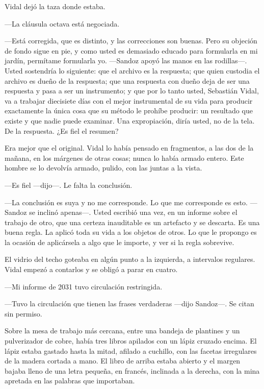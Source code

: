 Vidal dejó la taza donde estaba.

---La cláusula octava está negociada.

---Está corregida, que es distinto, y las correcciones son buenas. Pero su objeción de fondo sigue en pie, y como usted es demasiado educado para formularla en mi jardín, permítame formularla yo. ---Sandoz apoyó las manos en las rodillas---. Usted sostendría lo siguiente: que el archivo es la respuesta; que quien custodia el archivo es dueño de la respuesta; que una respuesta con dueño deja de ser una respuesta y pasa a ser un instrumento; y que por lo tanto usted, Sebastián Vidal, va a trabajar diecisiete días con el mejor instrumental de su vida para producir exactamente la única cosa que su método le prohíbe producir: un resultado que existe y que nadie puede examinar. Una expropiación, diría usted, no de la tela. De la respuesta. ¿Es fiel el resumen?

Era mejor que el original. Vidal lo había pensado en fragmentos, a las dos de la mañana, en los márgenes de otras cosas; nunca lo había armado entero. Este hombre se lo devolvía armado, pulido, con las juntas a la vista.

---Es fiel ---dijo---. Le falta la conclusión.

---La conclusión es suya y no me corresponde. Lo que me corresponde es esto. ---Sandoz se inclinó apenas---. Usted escribió una vez, en un informe sobre el trabajo de otro, que una certeza inauditable es un artefacto y se descarta. Es una buena regla. La aplicó toda su vida a los objetos de otros. Lo que le propongo es la ocasión de aplicársela a algo que le importe, y ver si la regla sobrevive.

El vidrio del techo goteaba en algún punto a la izquierda, a intervalos regulares. Vidal empezó a contarlos y se obligó a parar en cuatro.

---Mi informe de 2031 tuvo circulación restringida.

---Tuvo la circulación que tienen las frases verdaderas ---dijo Sandoz---. Se citan sin permiso.

Sobre la mesa de trabajo más cercana, entre una bandeja de plantines y un pulverizador de cobre, había tres libros apilados con un lápiz cruzado encima. El lápiz estaba gastado hasta la mitad, afilado a cuchillo, con las facetas irregulares de la madera cortada a mano. El libro de arriba estaba abierto y el margen bajaba lleno de una letra pequeña, en francés, inclinada a la derecha, con la mina apretada en las palabras que importaban.

